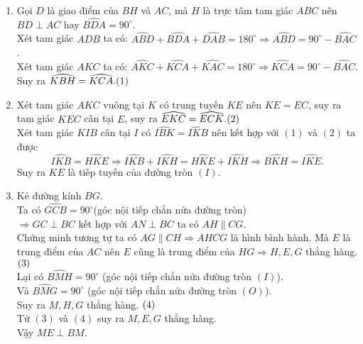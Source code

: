 \begin{ex}
{\begin{enumerate}
\item Gọi $D$ là giao điểm của $BH$ và $AC$, mà $H$ là trực tâm tam giác $ABC$ nên $BD\perp AC$ hay $\widehat{BDA}=90^\circ$.\\
Xét tam giác $ADB$ ta có: $\widehat{ABD}+\widehat{BDA}+\widehat{DAB}=180^\circ \Rightarrow \widehat{ABD}=90^\circ - \widehat{BAC}$.\\
Xét tam giác $AKC$ ta có: $\widehat{AKC}+\widehat{KCA}+\widehat{KAC}=180^\circ \Rightarrow \widehat{KCA}=90^\circ - \widehat{BAC}$.\\
Suy ra $\widehat{KBH}=\widehat{KCA}. \hfill (1)$
\item Xét tam giác $AKC$ vuông tại $K$ có trung tuyến $KE$ nên $KE=EC$, suy ra tam giác $KEC$ cân tại $E$, suy ra $\widehat{EKC}=\widehat{ECK}. \hfill (2)$\\
Xét tam giác $KIB$ cân tại $I$ có $\widehat{IBK}=\widehat{IKB}$ nên kết hợp với $(1)$ và  $(2)$ ta được
$$\widehat{IKB}=\widehat{HKE}\Rightarrow \widehat{IKB}+\widehat{IKH}=\widehat{HKE}+\widehat{IKH}\Rightarrow \widehat{BKH}=\widehat{IKE}.$$
Suy ra $KE$ là tiếp tuyến của đường tròn $(I)$.
\item Kẻ đường kính $BG$.\\
Ta có $\widehat{GCB}=90^\circ$(góc nội tiếp chắn nửa đường tròn)\\
$\Rightarrow GC \perp BC$ kết hợp với $AN\perp BC$ ta có $AH \parallel CG$. \\
Chứng minh tương tự ta có $AG\parallel CH\Rightarrow AHCG$ là hình bình hành. Mà $E$ là trung điểm của $AC$ nên $E$ cũng là trung điểm của $HG \Rightarrow H,E,G$ thẳng hàng. $\hfill (3)$\\
Lại có $\widehat{BMH}=90^\circ$ (góc nội tiếp chắn nửa đường tròn $(I)$).\\
Và $\widehat{BMG}=90^\circ$ (góc nội tiếp chắn nửa đường tròn $(O)$).\\
Suy ra $M,H,G$ thẳng hàng. $\hfill (4)$\\
Từ $(3)$ và $(4)$ suy ra $M,E,G$ thẳng hàng.\\
Vậy $ME\perp BM$.
 \end{enumerate}
	}
\end{ex}

